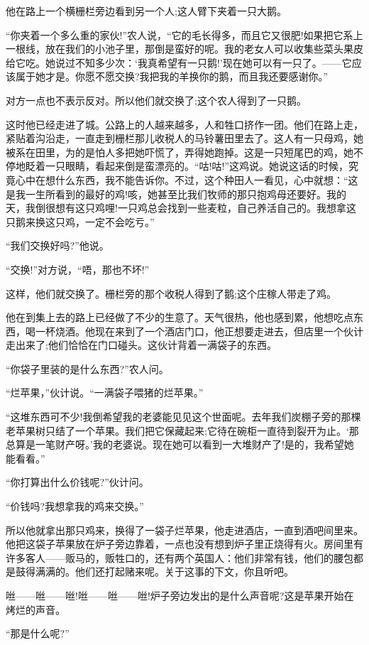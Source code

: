 \documentclass[10pt, a4paper]{ctexart} %
\begin{document}
他在路上一个横栅栏旁边看到另一个人;这人臂下夹着一只大鹅。

“你夹着一个多么重的家伙!”农人说，“它的毛长得多，而且它又很肥!如果把它系上一根线，放在我们的小池子里，那倒是蛮好的呢。我的老女人可以收集些菜头果皮给它吃。她说过不知多少次：‘我真希望有一只鹅!’现在她可以有一只了。——它应该属于她才是。你愿不愿交换?我把我的羊换你的鹅，而且我还要感谢你。”

对方一点也不表示反对。所以他们就交换了;这个农人得到了一只鹅。

这时他已经走进了城。公路上的人越来越多，人和牲口挤作一团。他们在路上走，紧贴着沟沿走，一直走到栅栏那儿收税人的马铃薯田里去了。这人有一只母鸡，她被系在田里，为的是怕人多把她吓慌了，弄得她跑掉。这是一只短尾巴的鸡，她不停地眨着一只眼睛，看起来倒是蛮漂亮的。“咕!咕!”这鸡说。她说这话的时候，究竟心中在想什么东西，我不能告诉你。不过，这个种田人一看见，心中就想：“这是我一生所看到的最好的鸡!咳，她甚至比我们牧师的那只抱鸡母还要好。我的天，我倒很想有这只鸡哩!一只鸡总会找到一些麦粒，自己养活自己的。我想拿这只鹅来换这只鸡，一定不会吃亏。”

“我们交换好吗?”他说。

“交换!”对方说，“唔，那也不坏!”

这样，他们就交换了。栅栏旁的那个收税人得到了鹅;这个庄稼人带走了鸡。

他在到集上去的路上已经做了不少的生意了。天气很热，他也感到累，他想吃点东西，喝一杯烧酒。他现在来到了一个酒店门口，他正想要走进去，但店里一个伙计走出来了;他们恰恰在门口碰头。这伙计背着一满袋子的东西。

“你袋子里装的是什么东西?”农人问。

“烂苹果，”伙计说。“一满袋子喂猪的烂苹果。”

“这堆东西可不少!我倒希望我的老婆能见见这个世面呢。去年我们炭棚子旁的那棵老苹果树只结了一个苹果。我们把它保藏起来;它待在碗柜一直待到裂开为止。‘那总算是一笔财产呀。’我的老婆说。现在她可以看到一大堆财产了!是的，我希望她能看看。”

“你打算出什么价钱呢?”伙计问。

“价钱吗?我想拿我的鸡来交换。”

所以他就拿出那只鸡来，换得了一袋子烂苹果，他走进酒店，一直到酒吧间里来。他把这袋子苹果放在炉子旁边靠着，一点也没有想到炉子里正烧得有火。房间里有许多客人——贩马的，贩牲口的，还有两个英国人：他们非常有钱，他们的腰包都是鼓得满满的。他们还打起赌来呢。关于这事的下文，你且听吧。

咝——咝——咝!咝——咝——咝!炉子旁边发出的是什么声音呢?这是苹果开始在烤烂的声音。

“那是什么呢?”
\end{document}
